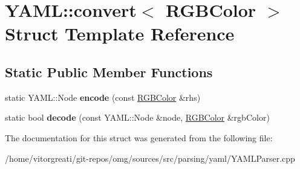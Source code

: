 \hypertarget{struct_y_a_m_l_1_1convert_3_01_r_g_b_color_01_4}{}\section{Y\+A\+ML\+::convert$<$ R\+G\+B\+Color $>$ Struct Template Reference}
\label{struct_y_a_m_l_1_1convert_3_01_r_g_b_color_01_4}
\subsection*{Static Public Member Functions}
\begin{DoxyCompactItemize}
\item 
\mbox{\label{struct_y_a_m_l_1_1convert_3_01_r_g_b_color_01_4_a53435107a4d117741eb69f1e4b837f1d}} 
static Y\+A\+M\+L\+::\+Node {\bfseries encode} (const \mbox{\hyperlink{classtao_1_1_col}{R\+G\+B\+Color}} \&rhs)
\item 
\mbox{\label{struct_y_a_m_l_1_1convert_3_01_r_g_b_color_01_4_a8696a3dc0862f142d82656eff201284a}} 
static bool {\bfseries decode} (const Y\+A\+M\+L\+::\+Node \&node, \mbox{\hyperlink{classtao_1_1_col}{R\+G\+B\+Color}} \&rgb\+Color)
\end{DoxyCompactItemize}


The documentation for this struct was generated from the following file\+:\begin{DoxyCompactItemize}
\item 
/home/vitorgreati/git-\/repos/omg/sources/src/parsing/yaml/Y\+A\+M\+L\+Parser.\+cpp\end{DoxyCompactItemize}
